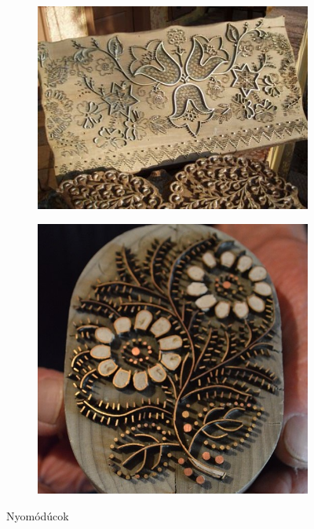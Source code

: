\documentclass[fontsize=12pt, appendixprefix=true]{scrreprt}
\begin{document}
\begin{figure}[h!]
	\begin{subfigure}[b]{0.2\linewidth}
		\includegraphics[width=\linewidth]{img/fémbőlkészült.jpg}
		\caption{}
	  \end{subfigure}
	  \begin{subfigure}[b]{0.15\linewidth}
		\includegraphics[width=\linewidth]{img/fémből készült 01.jpg}
		\caption{}
	  \end{subfigure}
	\caption{Nyomódúcok}
	\label{fig:duc}
  \end{figure}
\end{document}

